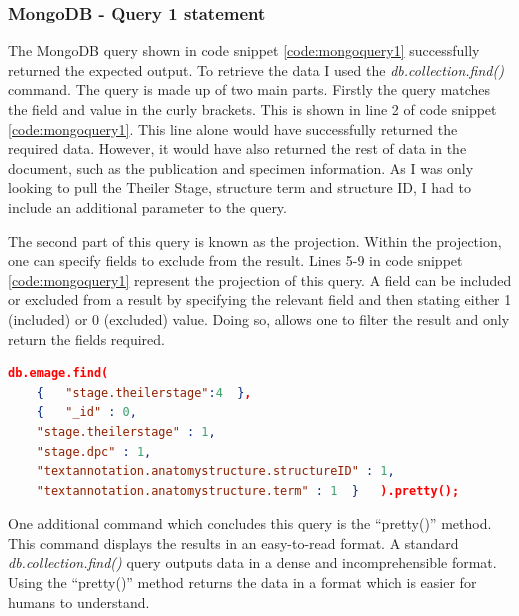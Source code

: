 \subsubsection*{MongoDB - Query 1 statement}\label{mongoquery1statement}
The MongoDB query shown in code snippet \ref{code:mongoquery1} successfully returned the expected output. To retrieve the data I used the \textit{db.collection.find()} command. The query is made up of two main parts. Firstly the query matches the field and value in the curly brackets. This is shown in line 2 of code snippet \ref{code:mongoquery1}. This line alone would have successfully returned the required data. However, it would have also returned the rest of data in the document, such as the publication and specimen information. As I was only looking to pull the Theiler Stage, structure term and structure ID, I had to include an additional parameter to the query.

The second part of this query is known as the projection. Within the projection, one can specify fields to exclude from the result. Lines 5-9 in code snippet \ref{code:mongoquery1} represent the projection of this query. A field can be included or excluded from a result by specifying the relevant field and then stating either 1 (included) or 0 (excluded) value. Doing so, allows one to filter the result and only return the fields required.
\begin{lstlisting}[language=json, caption=MongoDB Query 1 statement. All structures at Theiler Stage 4., label=code:mongoquery1]
db.emage.find(
	{	"stage.theilerstage":4	},
    {	"_id" : 0,
    "stage.theilerstage" : 1,
    "stage.dpc" : 1,
    "textannotation.anatomystructure.structureID" : 1,
    "textannotation.anatomystructure.term" : 1	}	).pretty();
\end{lstlisting}

One additional command which concludes this query is the ``pretty()'' method. This command displays the results in an easy-to-read format. A standard \textit{db.collection.find()} query outputs data in a dense and incomprehensible format. Using the ``pretty()'' method returns the data in a format which is easier for humans to understand.

